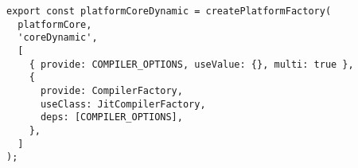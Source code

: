 \begin{verbatim}
export const platformCoreDynamic = createPlatformFactory(
  platformCore,
  'coreDynamic',
  [
    { provide: COMPILER_OPTIONS, useValue: {}, multi: true },
    {
      provide: CompilerFactory,
      useClass: JitCompilerFactory,
      deps: [COMPILER_OPTIONS],
    },
  ]
);
\end{verbatim}
